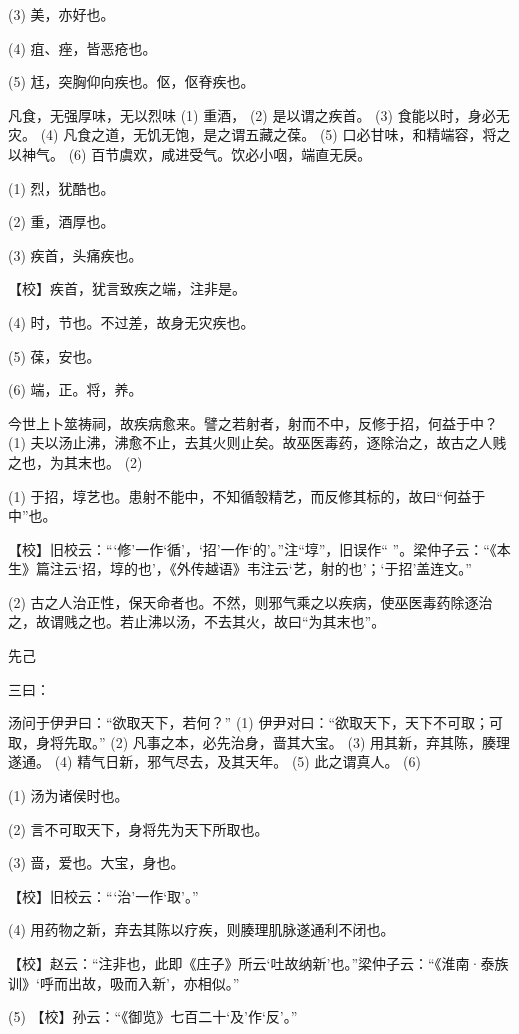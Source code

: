 \documentclass[12pt,UTF8]{ctexbook}
\begin{document}
(3) 美，亦好也。

(4) 疽、痤，皆恶疮也。

(5) 尪，突胸仰向疾也。伛，伛脊疾也。

凡食，无强厚味，无以烈味 (1) 重酒， (2) 是以谓之疾首。 (3) 食能以时，身必无灾。 (4) 凡食之道，无饥无饱，是之谓五藏之葆。 (5) 口必甘味，和精端容，将之以神气。 (6) 百节虞欢，咸进受气。饮必小咽，端直无戾。

(1) 烈，犹酷也。

(2) 重，酒厚也。

(3) 疾首，头痛疾也。

【校】疾首，犹言致疾之端，注非是。

(4) 时，节也。不过差，故身无灾疾也。

(5) 葆，安也。

(6) 端，正。将，养。

今世上卜筮祷祠，故疾病愈来。譬之若射者，射而不中，反修于招，何益于中？ (1) 夫以汤止沸，沸愈不止，去其火则止矣。故巫医毒药，逐除治之，故古之人贱之也，为其末也。 (2)

(1) 于招，埻艺也。患射不能中，不知循彀精艺，而反修其标的，故曰“何益于中”也。

【校】旧校云：“‘修’一作‘循’，‘招’一作‘的’。”注“埻”，旧误作“ ”。梁仲子云：“《本生》篇注云‘招，埻的也’，《外传越语》韦注云‘艺，射的也’；‘于招’盖连文。”

(2) 古之人治正性，保天命者也。不然，则邪气乘之以疾病，使巫医毒药除逐治之，故谓贱之也。若止沸以汤，不去其火，故曰“为其末也”。





先己


三曰：

汤问于伊尹曰：“欲取天下，若何？” (1) 伊尹对曰：“欲取天下，天下不可取；可取，身将先取。” (2) 凡事之本，必先治身，啬其大宝。 (3) 用其新，弃其陈，腠理遂通。 (4) 精气日新，邪气尽去，及其天年。 (5) 此之谓真人。 (6)

(1) 汤为诸侯时也。

(2) 言不可取天下，身将先为天下所取也。

(3) 啬，爱也。大宝，身也。

【校】旧校云：“‘治’一作‘取’。”

(4) 用药物之新，弃去其陈以疗疾，则腠理肌脉遂通利不闭也。

【校】赵云：“注非也，此即《庄子》所云‘吐故纳新’也。”梁仲子云：“《淮南·泰族训》‘呼而出故，吸而入新’，亦相似。”

(5) 【校】孙云：“《御览》七百二十‘及’作‘反’。”
\end{document}
